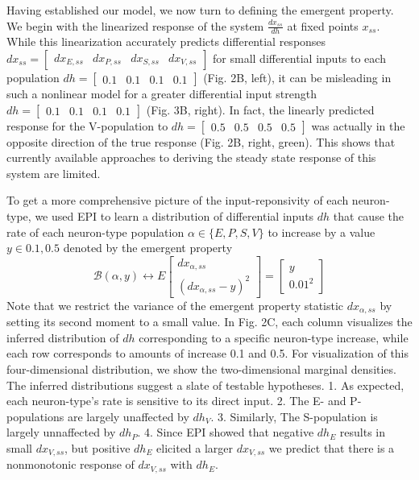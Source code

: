 \documentclass[11pt]{article}
\begin{document}
Having established our model, we now turn to defining the emergent property. We begin with the linearized response of the system $\frac{dx_{ss}}{dh}$ at fixed points $x_{ss}$.  
While this linearization accurately predicts differential responses $dx_{ss} = \begin{bmatrix} dx_{E,ss} & dx_{P,ss} & dx_{S,ss} & dx_{V,ss} \end{bmatrix}$  for small differential inputs to each population $dh = \begin{bmatrix} 0.1 & 0.1 & 0.1 & 0.1 \end{bmatrix}$ (Fig. 2B, left), it can be misleading in such a nonlinear model for a greater differential input strength $dh = \begin{bmatrix} 0.1 & 0.1 & 0.1 & 0.1 \end{bmatrix}$ (Fig. 3B, right). In fact, the linearly predicted response for the V-population to $dh = \begin{bmatrix} 0.5 & 0.5 & 0.5 & 0.5 \end{bmatrix}$ was actually in the opposite direction of the true response (Fig. 2B, right, green).  This shows that currently available approaches  to deriving the steady state response of this system are limited.

To get a more comprehensive picture of the input-reponsivity of each neuron-type, we used EPI to learn a distribution of differential inputs $dh$ that cause the rate of each neuron-type population $\alpha \in \{E, P, S, V \}$ to increase by a value $y \in {0.1, 0.5}$ denoted by the emergent property 
\begin{equation}
\mathcal{B}(\alpha, y) \leftrightarrow 
E \begin{bmatrix} dx_{\alpha,ss} \\ (dx_{\alpha,ss} - y)^2 \end{bmatrix} = \begin{bmatrix} y \\ 0.01^2 \end{bmatrix}
\end{equation}
Note that we restrict the variance of the emergent property statistic $dx_{\alpha,ss}$ by setting its second moment to a small value. In Fig. 2C, each column visualizes the inferred distribution of $dh$ corresponding to a specific neuron-type increase, while each row corresponds to amounts of increase 0.1 and 0.5. For visualization of this four-dimensional distribution, we show the two-dimensional marginal densities.  The inferred distributions suggest a slate of testable hypotheses. 1. As expected, each neuron-type's rate is sensitive to its direct input.  2. The E- and P-populations are largely unaffected by $dh_V$. 3. Similarly, The S-population is largely unnaffected by $dh_P$. 4. Since EPI showed that negative $dh_E$ results in small $dx_{V,ss}$, but positive $dh_E$ elicited a larger $dx_{V,ss}$ we predict that there is a nonmonotonic response of $dx_{V,ss}$ with $dh_{E}$.
\end{document}
